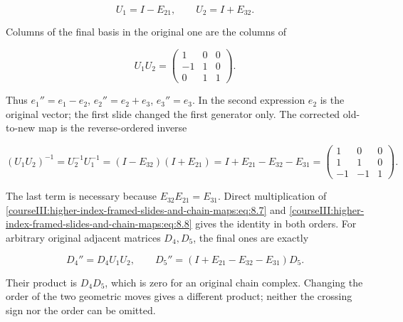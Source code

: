 \begin{equation}
U_1=I-E_{21},\qquad U_2=I+E_{32}.
 \label{courseIII:higher-index-framed-slides-and-chain-maps:eq:8.6}
\end{equation}

Columns of the final basis in the original one are the columns of

\begin{equation}
U_1U_2=
 \begin{pmatrix}1&0&0\\-1&1&0\\0&1&1\end{pmatrix}.
 \label{courseIII:higher-index-framed-slides-and-chain-maps:eq:8.7}
\end{equation}

Thus \(e_1''=e_1-e_2\), \(e_2''=e_2+e_3\), \(e_3''=e_3\). In the second expression \(e_2\) is the original vector; the first slide changed the first generator only. The corrected old-to-new map is the reverse-ordered inverse

\begin{equation}
(U_1U_2)^{-1}=U_2^{-1}U_1^{-1}
 =(I-E_{32})(I+E_{21})
 =I+E_{21}-E_{32}-E_{31}
 =\begin{pmatrix}1&0&0\\1&1&0\\-1&-1&1\end{pmatrix}.
 \label{courseIII:higher-index-framed-slides-and-chain-maps:eq:8.8}
\end{equation}

The last term is necessary because \(E_{32}E_{21}=E_{31}\). Direct multiplication of \eqref{courseIII:higher-index-framed-slides-and-chain-maps:eq:8.7} and \eqref{courseIII:higher-index-framed-slides-and-chain-maps:eq:8.8} gives the identity in both orders. For arbitrary original adjacent matrices \(D_4,D_5\), the final ones are exactly

\begin{equation}
D_4''=D_4U_1U_2,\qquad
 D_5''=(I+E_{21}-E_{32}-E_{31})D_5.
 \label{courseIII:higher-index-framed-slides-and-chain-maps:eq:8.9}
\end{equation}

Their product is \(D_4D_5\), which is zero for an original chain complex. Changing the order of the two geometric moves gives a different product; neither the crossing sign nor the order can be omitted.
